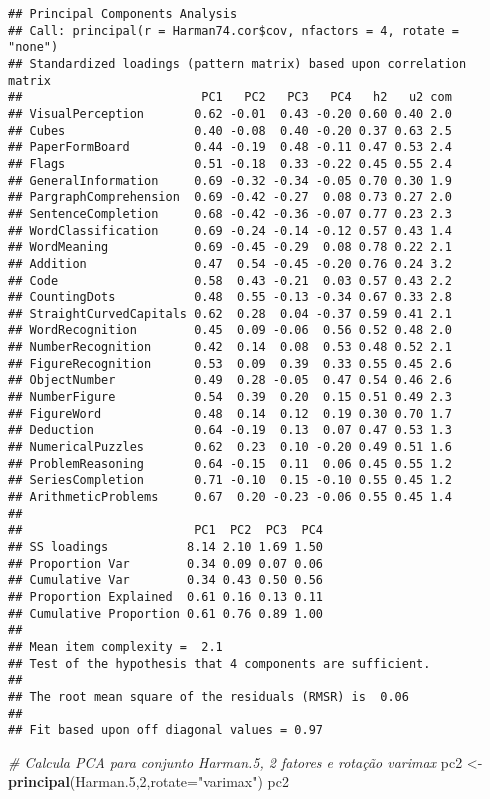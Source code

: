 \documentclass[]{book}
\newenvironment{Shaded}{\begin{snugshade}}{\end{snugshade}}
\newcommand{\KeywordTok}[1]{\textcolor[rgb]{0.13,0.29,0.53}{\textbf{{#1}}}}
\newcommand{\DataTypeTok}[1]{\textcolor[rgb]{0.13,0.29,0.53}{{#1}}}
\newcommand{\DecValTok}[1]{\textcolor[rgb]{0.00,0.00,0.81}{{#1}}}
\newcommand{\FloatTok}[1]{\textcolor[rgb]{0.00,0.00,0.81}{{#1}}}
\newcommand{\StringTok}[1]{\textcolor[rgb]{0.31,0.60,0.02}{{#1}}}
\newcommand{\CommentTok}[1]{\textcolor[rgb]{0.56,0.35,0.01}{\textit{{#1}}}}
\newcommand{\NormalTok}[1]{{#1}}
\begin{document}
\begin{verbatim}
## Principal Components Analysis
## Call: principal(r = Harman74.cor$cov, nfactors = 4, rotate = "none")
## Standardized loadings (pattern matrix) based upon correlation matrix
##                         PC1   PC2   PC3   PC4   h2   u2 com
## VisualPerception       0.62 -0.01  0.43 -0.20 0.60 0.40 2.0
## Cubes                  0.40 -0.08  0.40 -0.20 0.37 0.63 2.5
## PaperFormBoard         0.44 -0.19  0.48 -0.11 0.47 0.53 2.4
## Flags                  0.51 -0.18  0.33 -0.22 0.45 0.55 2.4
## GeneralInformation     0.69 -0.32 -0.34 -0.05 0.70 0.30 1.9
## PargraphComprehension  0.69 -0.42 -0.27  0.08 0.73 0.27 2.0
## SentenceCompletion     0.68 -0.42 -0.36 -0.07 0.77 0.23 2.3
## WordClassification     0.69 -0.24 -0.14 -0.12 0.57 0.43 1.4
## WordMeaning            0.69 -0.45 -0.29  0.08 0.78 0.22 2.1
## Addition               0.47  0.54 -0.45 -0.20 0.76 0.24 3.2
## Code                   0.58  0.43 -0.21  0.03 0.57 0.43 2.2
## CountingDots           0.48  0.55 -0.13 -0.34 0.67 0.33 2.8
## StraightCurvedCapitals 0.62  0.28  0.04 -0.37 0.59 0.41 2.1
## WordRecognition        0.45  0.09 -0.06  0.56 0.52 0.48 2.0
## NumberRecognition      0.42  0.14  0.08  0.53 0.48 0.52 2.1
## FigureRecognition      0.53  0.09  0.39  0.33 0.55 0.45 2.6
## ObjectNumber           0.49  0.28 -0.05  0.47 0.54 0.46 2.6
## NumberFigure           0.54  0.39  0.20  0.15 0.51 0.49 2.3
## FigureWord             0.48  0.14  0.12  0.19 0.30 0.70 1.7
## Deduction              0.64 -0.19  0.13  0.07 0.47 0.53 1.3
## NumericalPuzzles       0.62  0.23  0.10 -0.20 0.49 0.51 1.6
## ProblemReasoning       0.64 -0.15  0.11  0.06 0.45 0.55 1.2
## SeriesCompletion       0.71 -0.10  0.15 -0.10 0.55 0.45 1.2
## ArithmeticProblems     0.67  0.20 -0.23 -0.06 0.55 0.45 1.4
## 
##                        PC1  PC2  PC3  PC4
## SS loadings           8.14 2.10 1.69 1.50
## Proportion Var        0.34 0.09 0.07 0.06
## Cumulative Var        0.34 0.43 0.50 0.56
## Proportion Explained  0.61 0.16 0.13 0.11
## Cumulative Proportion 0.61 0.76 0.89 1.00
## 
## Mean item complexity =  2.1
## Test of the hypothesis that 4 components are sufficient.
## 
## The root mean square of the residuals (RMSR) is  0.06 
## 
## Fit based upon off diagonal values = 0.97
\end{verbatim}

\begin{Shaded}
\begin{Highlighting}[]
\CommentTok{# Calcula PCA para conjunto Harman.5, 2 fatores e rotação varimax}
\NormalTok{pc2 <-}\StringTok{ }\KeywordTok{principal}\NormalTok{(Harman}\FloatTok{.5}\NormalTok{,}\DecValTok{2}\NormalTok{,}\DataTypeTok{rotate=}\StringTok{"varimax"}\NormalTok{)}
\NormalTok{pc2}
\end{Highlighting}
\end{Shaded}
\end{document}
